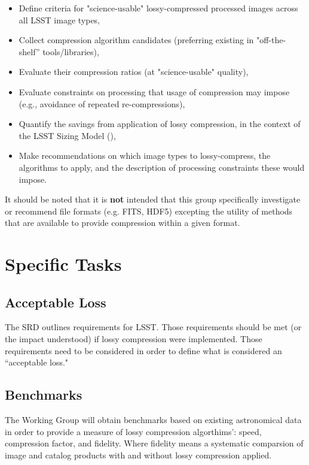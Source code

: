 \begin{itemize}
    \item Define criteria for "science-usable" lossy-compressed processed images across all LSST image types,
    \item Collect compression algorithm candidates (preferring existing in "off-the-shelf” tools/libraries),
    \item Evaluate their compression ratios (at "science-usable" quality),
    \item Evaluate constraints on processing that usage of compression may impose (e.g., avoidance of repeated re-compressions),
    \item Quantify the savings from application of lossy compression, in the context of the LSST Sizing Model (),
    \item Make recommendations on which image types to lossy-compress, the algorithms to apply, and the description of processing constraints these would impose.
\end{itemize}

It should be noted that it is \textbf{not} intended that this group specifically
investigate or recommend file formats (e.g. FITS, HDF5) excepting the utility 
of methods that are available to provide compression within a given format.


\section{Specific Tasks}

\subsection{Acceptable Loss}

The SRD outlines requirements for LSST.  Those requirements should be met 
(or the impact understood) if lossy compression were implemented.  Those 
requirements need to be considered in order to define what is considered 
an ``acceptable loss."

\subsection{Benchmarks}

The Working Group will obtain benchmarks based on existing astronomical data in order 
to provide a measure of lossy compression algorthims': speed, compression factor, 
and fidelity.  Where fidelity means a systematic comparsion of image and catalog 
products with and without lossy compression applied.


